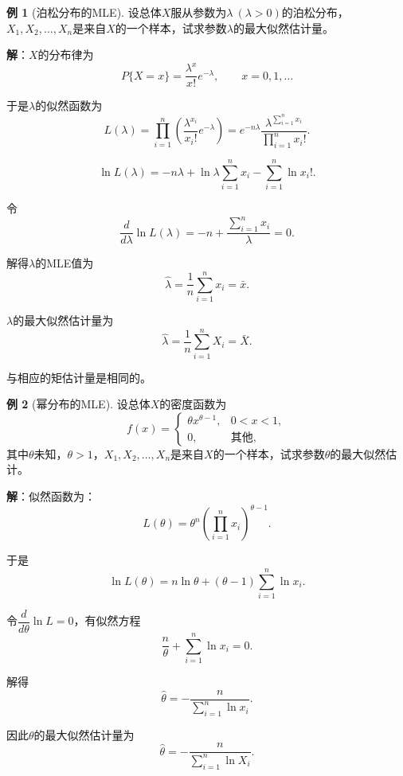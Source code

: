 \documentclass[11pt,a4paper]{report}
\theoremstyle{definition}
\newtheorem{example}{例}[chapter]
\begin{document}
\begin{example}[泊松分布的MLE]
设总体$X$服从参数为$\lambda\ (\lambda>0)$的泊松分布，$X_{1},X_{2},\ldots,X_{n}$是来自$X$的一个样本，试求参数$\lambda$的最大似然估计量。

\textbf{解}：$X$的分布律为
\[
P\{X=x\}=\frac{\lambda^{x}}{x!}e^{-\lambda},\qquad x=0,1,\ldots
\]

于是$\lambda$的似然函数为
\[
L(\lambda)=\prod_{i=1}^{n}\left(\frac{\lambda^{x_{i}}}{x_{i}!}e^{-\lambda}\right)=e^{-n\lambda}\frac{\lambda^{\sum_{i=1}^{n}x_{i}}}{\prod_{i=1}^{n}x_{i}!}.
\]

\[
\ln L(\lambda)=-n\lambda+\ln\lambda\sum_{i=1}^{n}x_{i}-\sum_{i=1}^{n}\ln x_{i}!.
\]

令
\[
\frac{d}{d\lambda}\ln L(\lambda)=-n+\frac{\sum_{i=1}^{n}x_{i}}{\lambda}=0.
\]

解得$\lambda$的MLE值为
\[
\hat{\lambda}=\frac{1}{n}\sum_{i=1}^{n}x_{i}=\bar{x}.
\]

$\lambda$的最大似然估计量为
\[
\hat{\lambda}=\frac{1}{n}\sum_{i=1}^{n}X_{i}=\bar{X}.
\]

与相应的矩估计量是相同的。
\end{example}

\begin{example}[幂分布的MLE]
设总体$X$的密度函数为
\[
f(x)=
\begin{cases}
\theta x^{\theta-1}, & 0<x<1,\\[0.3em]
0, & \text{其他},
\end{cases}
\]
其中$\theta$未知，$\theta>1$，$X_{1},X_{2},\ldots,X_{n}$是来自$X$的一个样本，试求参数$\theta$的最大似然估计。

\textbf{解}：似然函数为：
\[
L(\theta)=\theta^{n}\left(\prod_{i=1}^{n}x_{i}\right)^{\theta-1}.
\]

于是
\[
\ln L(\theta)=n\ln\theta+(\theta-1)\sum_{i=1}^{n}\ln x_{i}.
\]

令$\dfrac{d}{d\theta}\ln L=0$，有似然方程
\[
\frac{n}{\theta}+\sum_{i=1}^{n}\ln x_{i}=0.
\]

解得
\[
\hat{\theta}=-\frac{n}{\sum_{i=1}^{n}\ln x_{i}}.
\]

因此$\theta$的最大似然估计量为
\[
\hat{\theta}=-\frac{n}{\sum_{i=1}^{n}\ln X_{i}}.
\]
\end{example}
\end{document}
